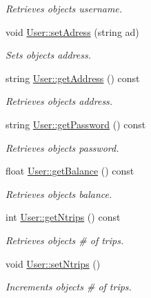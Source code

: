 \begin{DoxyCompactItemize}
\begin{DoxyCompactList}\small\item\em Retrieves object\textquotesingle{}s username. \end{DoxyCompactList}\item 
void \hyperlink{group___user_ga02324144fd363369f11b7aca8f117865}{User\+::set\+Adress} (string ad)
\begin{DoxyCompactList}\small\item\em Sets object\textquotesingle{}s address. \end{DoxyCompactList}\item 
string \hyperlink{group___user_gaef1759300db1bca3c84af6af79f00365}{User\+::get\+Address} () const
\begin{DoxyCompactList}\small\item\em Retrieves object\textquotesingle{}s address. \end{DoxyCompactList}\item 
string \hyperlink{group___user_ga33429bdd1253091697a9c5c5e1448bee}{User\+::get\+Password} () const
\begin{DoxyCompactList}\small\item\em Retrieves object\textquotesingle{}s password. \end{DoxyCompactList}\item 
float \hyperlink{group___user_ga713b20a844b9e70630a50dd5f1357d95}{User\+::get\+Balance} () const
\begin{DoxyCompactList}\small\item\em Retrieves object\textquotesingle{}s balance. \end{DoxyCompactList}\item 
int \hyperlink{group___user_gadfbbdc7ea72e051b7b7b8d41c14eb846}{User\+::get\+Ntrips} () const
\begin{DoxyCompactList}\small\item\em Retrieves object\textquotesingle{}s \# of trips. \end{DoxyCompactList}\item 
\mbox{\label{group___user_ga738dab753a5a3ba6e1315caaf4765a24}} 
void \hyperlink{group___user_ga738dab753a5a3ba6e1315caaf4765a24}{User\+::set\+Ntrips} ()
\begin{DoxyCompactList}\small\item\em Increments object\textquotesingle{}s \# of trips. \end{DoxyCompactList}\item 

\end{DoxyCompactItemize}
